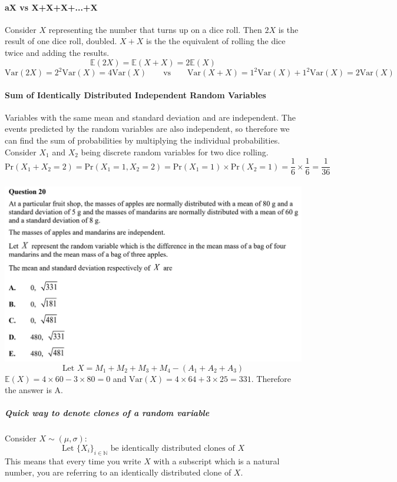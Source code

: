 \documentclass[a4paper,twoside,10pt]{article}
\newcommand{\E}{\mathbb{E}}
\newenvironment{examquestion}[1]{%
	\mbox{}\\\tcolorbox[beamer,breakable,%
	title=Exam-style Question: #1,standard jigsaw,opacityback=0, colframe=red!75!black, boxrule=2pt]}{\endtcolorbox\mbox{}\\}
\begin{document}
			\paragraph{aX vs X+X+X+...+X} Consider $X$ representing the number that turns up on a dice roll. Then $2X$ is the result of one dice roll, doubled. $X+X$ is the the equivalent of rolling the dice twice and adding the results.
			\[
				\E(2X)=\E(X+X)=2\E(X)
			\]
			\[
				\mathrm{Var}(2X)=2^2\mathrm{Var}(X)=4\mathrm{Var}(X) \qquad \text{vs} \qquad \mathrm{Var}(X+X)=1^2\mathrm{Var}(X)+1^2\mathrm{Var}(X)=2\mathrm{Var}(X)
			\]
			
			\paragraph{Sum of Identically Distributed Independent Random Variables} Variables with the same mean and standard deviation and are independent. The events predicted by the random variables are also independent, so therefore we can find the sum of probabilities by multiplying the individual probabilities. Consider $X_1$ and $X_2$ being discrete random variables for two dice rolling.
			\[
				\mathrm{Pr}(X_1+X_2=2)=\mathrm{Pr}(X_1=1,X_2=2)=\mathrm{Pr}(X_1=1)\times\mathrm{Pr}(X_2=1)=\frac{1}{6}\times\frac{1}{6}=\frac{1}{36}
			\]
			\begin{examquestion}{2023 MAV Spec E2 QA20}
				\includegraphics[width=\linewidth]{./img/2023mavspece2a20.png}
				\[
					\text{Let }X=M_1+M_2+M_3+M_4-(A_1+A_2+A_3)
				\]
				$\E(X)=4\times60-3\times80=0$ and $\mathrm{Var}(X)=4\times64+3\times25=331$. Therefore the answer is A.
			\end{examquestion}
			
				\subparagraph{Quick way to denote clones of a random variable} Consider $X\sim(\mu,\sigma)$:
				\[
					\text{Let } \{X_i\}_{i\in\mathbb{N}}\text{ be identically distributed clones of } X
				\]
				This means that every time you write $X$ with a subscript which is a natural number, you are referring to an identically distributed clone of $X$.
			
\end{document}
